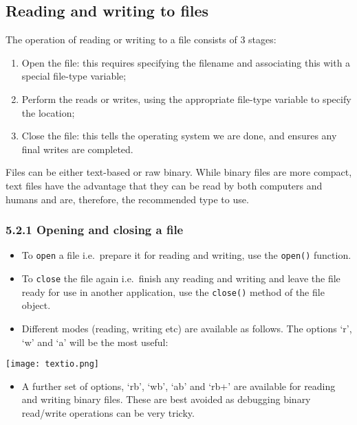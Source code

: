 \documentclass[10pt]{article}
\makeatletter
\def\maxwidth{\ifdim\Gin@nat@width>\linewidth\linewidth
    \else\Gin@nat@width\fi}
\providecommand{\tightlist}{%
      \setlength{\itemsep}{0pt}\setlength{\parskip}{0pt}}
\makeatother
\begin{document}
    \hypertarget{reading-and-writing-to-files}{%
\subsection{Reading and writing to
files}\label{reading-and-writing-to-files}}

The operation of reading or writing to a file consists of 3 stages:

\begin{enumerate}
\def\labelenumi{\arabic{enumi}.}
\tightlist
\item
  Open the file: this requires specifying the filename and associating
  this with a special file-type variable;
\item
  Perform the reads or writes, using the appropriate file-type variable
  to specify the location;
\item
  Close the file: this tells the operating system we are done, and
  ensures any final writes are completed.
\end{enumerate}

Files can be either text-based or raw binary. While binary files are
more compact, text files have the advantage that they can be read by
both computers and humans and are, therefore, the recommended type to
use.

\hypertarget{opening-and-closing-a-file}{%
\subsubsection*{5.2.1 Opening and closing a
file}\label{opening-and-closing-a-file}}

\begin{itemize}
\tightlist
\item
  To \texttt{open} a file i.e.~prepare it for reading and writing, use
  the \texttt{open()} function.
\item
  To \texttt{close} the file again i.e.~finish any reading and writing
  and leave the file ready for use in another application, use the
  \texttt{close()} method of the file object.
\item
  Different modes (reading, writing etc) are available as follows. The
  options `r', `w' and `a' will be the most useful:
\end{itemize}

\texttt{[image: textio.png]}
\begin{itemize}
\tightlist
\item
  A further set of options, `rb', `wb', `ab' and `rb+' are available for
  reading and writing binary files. These are best avoided as debugging
  binary read/write operations can be very tricky.
\end{itemize}
\end{document}
